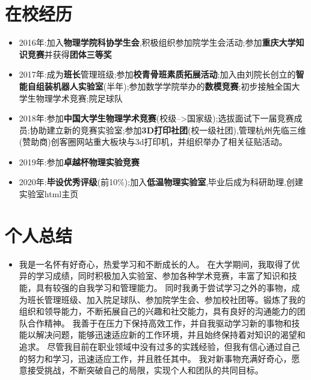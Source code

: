 \documentclass{resume}
\begin{document}
\vspace{0.5cm}

\section{在校经历}

\begin{itemize}
  \item 2016年:加入\textbf{物理学院科协学生会},积极组织参加院学生会活动;参加\textbf{重庆大学知识竞赛}并获得\textbf{团体三等奖}
  \item 2017年:成为\textbf{班长}管理班级;参加\textbf{校青骨班素质拓展活动};加入由刘院长创立的\textbf{智能自组装机器人实验室}(半年);参加数学学院举办的\textbf{数模竞赛};初步接触全国大学生物理学术竞赛;院足球队
  \item 2018年:参加\textbf{中国大学生物理学术竞赛}(校级-->国家级);选拔面试下一届竞赛成员;协助建立新的竞赛实验室;参加\textbf{3D打印社团}(校一级社团),管理杭州先临三维(赞助商)创客圈网站重大板块与3d打印机，并组织举办了相关征贴活动。
  \item 2019年:参加\textbf{卓越杯物理实验竞赛}
  \item 2020年:\textbf{毕设优秀评级}(前10\%);加入\textbf{低温物理实验室},毕业后成为科研助理,创建实验室html主页
\end{itemize}

\vspace{0.5cm}

\section{个人总结}

\begin{itemize}
  \item 
  我是一名怀有好奇心，热爱学习和不断成长的人。
  在大学期间，我取得了优异的学习成绩，同时积极加入实验室、参加各种学术竞赛，丰富了知识和技能，具有较强的自我学习和管理能力。
  同时我勇于尝试学习之外的事物，成为班长管理班级、加入院足球队、参加院学生会、参加校社团等。锻炼了我的组织和领导能力，不断拓展自己的兴趣和社交能力，具有良好的沟通能力的团队合作精神。
  我善于在压力下保持高效工作，并自我驱动学习新的事物和技能以解决问题，能够迅速适应新的工作环境，并且始终保持着对知识的渴望和追求。
  尽管我目前在职业领域中没有过多的实践经验，但我有信心通过自己的努力和学习，迅速适应工作，并且胜任其中。
  我对新事物充满好奇心，愿意接受挑战，不断突破自己的局限，实现个人和团队的共同目标。
  
  
  
\end{itemize}
\end{document}
